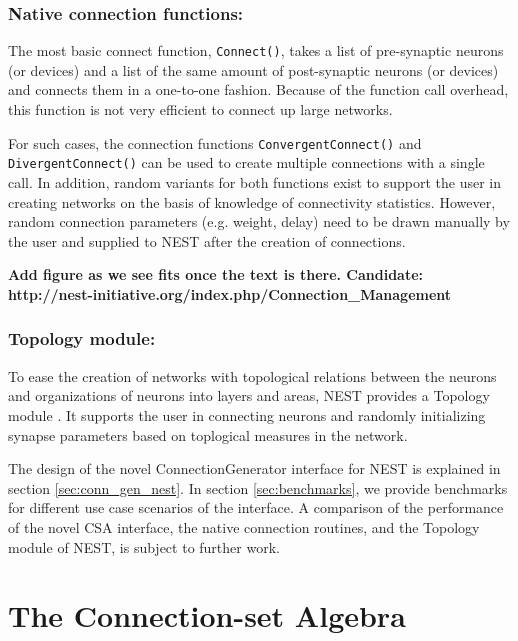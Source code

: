 \documentclass{frontiersSCNS} %
\newcommand{\tbw}[1]{{\bf\parindent0pt\color{red}#1}}
\begin{document}
\subsubsection*{Native connection functions:}

The most basic connect function, \verb|Connect()|, takes a list of
pre-synaptic neurons (or devices) and a list of the same amount of
post-synaptic neurons (or devices) and connects them in a one-to-one
fashion. Because of the function call overhead, this function is not
very efficient to connect up large networks.

For such cases, the connection functions \verb|ConvergentConnect()|
and \verb|DivergentConnect()| can be used to create multiple
connections with a single call. In addition, random variants for both
functions exist to support the user in creating networks on the basis
of knowledge of connectivity statistics. However, random connection
parameters (e.g. weight, delay) need to be drawn manually by the user
and supplied to NEST after the creation of connections.

\tbw{Add figure as we see fits once the text is there. Candidate:\\
  http://nest-initiative.org/index.php/Connection\_Management}

\subsubsection*{Topology module:}

To ease the creation of networks with topological relations between
the neurons and organizations of neurons into layers and areas, NEST
provides a Topology module \citep{Plesser_13}. It supports the user in
connecting neurons and randomly initializing synapse parameters based
on toplogical measures in the network.

The design of the novel ConnectionGenerator interface for NEST is
explained in section \ref{sec:conn_gen_nest}. In section
\ref{sec:benchmarks}, we provide benchmarks for different use case
scenarios of the interface. A comparison of the performance of the
novel CSA interface, the native connection routines, and the Topology
module of NEST, is subject to further work.


\section{The Connection-set Algebra}\label{sec:csa}
\end{document}
